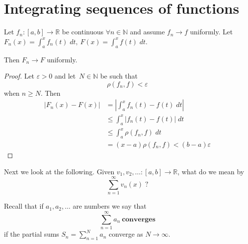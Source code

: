 \newpage 
\section{Integrating sequences of functions}
\begin{thm}
    Let $f_n : [a,b] \to \mathbb R$ be continuous 
    $\forall n \in \mathbb N$ and assume 
    $f_n \to f$ uniformly. Let $F_n(x) = 
    \displaystyle\int_a^x f_n(t) \;dt, \ F(x) = 
    \displaystyle\int_a^x f(t) \; dt$. 

    Then $F_n \to F$ uniformly. 
\end{thm}
\begin{proof}
    Let $\varepsilon > 0$ and let $N \in \mathbb N$ be such that 
    \[
        \rho(f_n,f) < \varepsilon
    \]
    when $n \geq N$. Then 
    \begin{align*}
        |F_n(x) - F(x)| &= \left|\displaystyle\int_a^x f_n(t) 
        - f(t) \; dt\right| \\ 
                        &\leq \displaystyle\int_a^x \left|
                        f_n(t) - f(t) \right| \; dt \\ 
                        &\leq \displaystyle\int_a^x \rho(f_n,f) \; dt 
                        \\ 
                        &= (x-a)\rho(f_n,f) < (b-a) \varepsilon
    \end{align*}
\end{proof}

Next we look at the following. Given $v_1,v_2,\ldots : [a,b] 
\to \mathbb R$, what do we mean by 
\[
    \displaystyle\sum_{n=1}^{\infty}v_n(x)\; ?
\]

Recall that if $a_1,a_2,\ldots$ are numbers we say that 
\[
    \displaystyle\sum_{n=1}^{\infty}a_n \ \textbf{converges}
\]
if the partial sums $S_n = \sum_{n=1}^{N}a_n$ converge as 
$N \to \infty$. 

